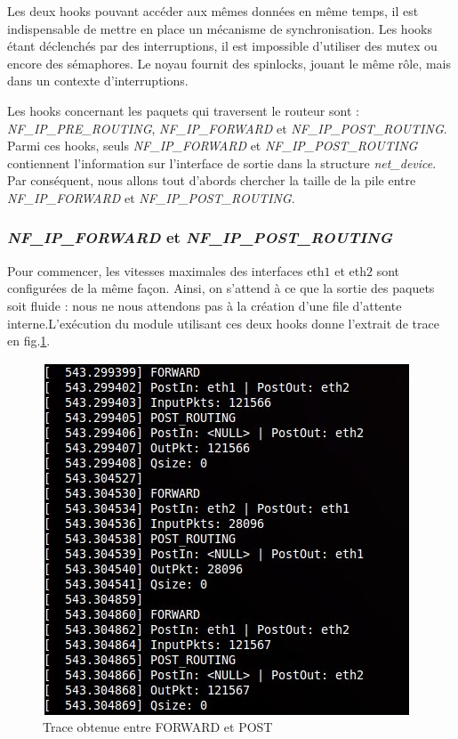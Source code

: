 \documentclass[a4paper]{article}
\begin{document}
Les deux hooks pouvant accéder aux mêmes données en même temps,
il est indispensable de mettre en place un mécanisme de
synchronisation. Les hooks étant déclenchés par des interruptions,
il est impossible d'utiliser des mutex ou encore des sémaphores.
Le noyau fournit des spinlocks, jouant le même rôle, mais dans
un contexte d'interruptions.

Les hooks concernant les paquets qui traversent le routeur sont :
\textit{NF\_IP\_PRE\_ROUTING}, \textit{NF\_IP\_FORWARD} et
\textit{NF\_IP\_POST\_ROUTING}. Parmi ces hooks, seuls
\textit{NF\_IP\_FORWARD} et \textit{NF\_IP\_POST\_ROUTING}
contiennent l'information sur l'interface de sortie dans la
structure \textit{net\_device}. Par conséquent, nous allons
tout d'abords chercher la taille de la pile entre
\textit{NF\_IP\_FORWARD} et \textit{NF\_IP\_POST\_ROUTING}.

\subsubsection{\textit{NF\_IP\_FORWARD} et \textit{NF\_IP\_POST\_ROUTING}}
Pour commencer, les vitesses maximales des interfaces eth$1$ et
eth$2$ sont configurées de la même façon. Ainsi, on s'attend à
ce que la sortie des paquets soit fluide : nous ne nous attendons
pas à la création d'une file d'attente interne.L'exécution du module
utilisant ces deux hooks donne l'extrait de trace en
fig.\ref{forwardpost}.

\begin{figure}
	\centering
	\includegraphics[scale=.5]{forward_post.jpg}
	\caption{\label{forwardpost} Trace obtenue entre FORWARD et POST}
\end{figure}
\end{document}
